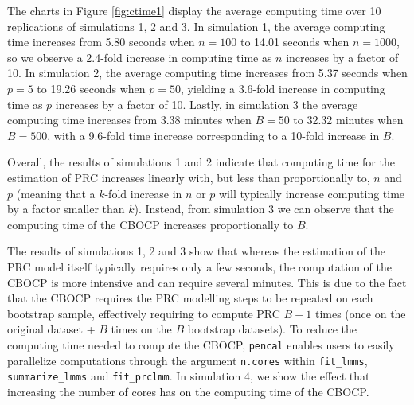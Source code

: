 The charts in Figure \ref{fig:ctime1} display the average computing time
over 10 replications of simulations 1, 2 and 3. In simulation 1, the
average computing time increases from 5.80 seconds when \(n = 100\) to
14.01 seconds when \(n = 1000\), so we observe a 2.4-fold increase in
computing time as \(n\) increases by a factor of 10. In simulation 2,
the average computing time increases from 5.37 seconds when \(p = 5\) to
19.26 seconds when \(p = 50\), yielding a 3.6-fold increase in computing
time as \(p\) increases by a factor of 10. Lastly, in simulation 3 the
average computing time increases from 3.38 minutes when \(B = 50\) to
32.32 minutes when \(B = 500\), with a 9.6-fold time increase
corresponding to a 10-fold increase in \(B\).

Overall, the results of simulations 1 and 2 indicate that computing time
for the estimation of PRC increases linearly with, but less than
proportionally to, \(n\) and \(p\) (meaning that a \(k\)-fold increase
in \(n\) or \(p\) will typically increase computing time by a factor
smaller than \(k\)). Instead, from simulation 3 we can observe that the
computing time of the CBOCP increases proportionally to \(B\).

The results of simulations 1, 2 and 3 show that whereas the estimation
of the PRC model itself typically requires only a few seconds, the
computation of the CBOCP is more intensive and can require several
minutes. This is due to the fact that the CBOCP requires the PRC
modelling steps to be repeated on each bootstrap sample, effectively
requiring to compute PRC \(B + 1\) times (once on the original dataset +
\(B\) times on the \(B\) bootstrap datasets). To reduce the computing
time needed to compute the CBOCP, \texttt{pencal} enables users to
easily parallelize computations through the argument \texttt{n.cores}
within \texttt{fit\_lmms}, \texttt{summarize\_lmms} and
\texttt{fit\_prclmm}. In simulation 4, we show the effect that
increasing the number of cores has on the computing time of the CBOCP.

